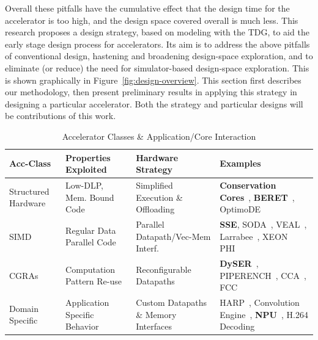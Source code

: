 Overall these pitfalls have the cumulative effect that the design time for the
accelerator is too high, and the design space covered overall is much less. 
This research proposes a design strategy, based on modeling
with the TDG, to aid the early stage design process for accelerators.  
Its aim is to address the above pitfalls of conventional design, 
hastening and broadening design-space exploration, and to
eliminate (or reduce) the need for simulator-based design-space exploration.  
This is shown graphically in Figure~\ref{fig:design-overview}.
This section first describes our methodology,
then present preliminary results in applying
this strategy in designing a particular accelerator.  Both the strategy and
particular designs will be contributions of this work.

\begin{table}
\footnotesize
\def\arraystretch{1.05}
\setlength{\tabcolsep}{.12em}

     \begin{tabular}{>{\RaggedRight}p{0.9in}>{\RaggedRight}p{1.7in}>{\RaggedRight}p{1.7in}>{\RaggedRight}p{2.1in}}  \toprule
    \textbf{Acc-Class} & \textbf{Properties Exploited} &  \textbf{Hardware Strategy} & \textbf{Examples}  \\ \midrule

    Structured Hardware
    & Low-DLP, Mem. Bound Code 
    & Simplified Execution \& Offloading 
    & \textbf{Conservation Cores}~\cite{ccores}, \textbf{BERET}~\cite{Gupta:2011:BER:2155620.2155623}, OptimoDE~\cite{optimoDE}
   \\ 

   SIMD 
   & Regular Data Parallel Code 
   & Parallel Datapath/Vec-Mem Interf.
   & \textbf{SSE}, SODA~\cite{Lin:2006:SLA:1135775.1136494}, VEAL~\cite{VEAL}, Larrabee~\cite{larrabee}, XEON PHI~\cite{chrysos2012intel}
   \\

   CGRAs
   & Computation Pattern Re-use
   & Reconfigurable Datapaths
   & \textbf{DySER}~\cite{hpca2011:dyser}, PIPERENCH~\cite{PipeRench}, CCA~\cite{Clark:2004:APG:1038264.1038929}, FCC~\cite{1629148}
   \\

   Domain Specific
   & Application Specific Behavior
   & Custom Datapaths \& Memory Interfaces
   & HARP~\cite{Wu:2013:NBD:2485922.2485944}, Convolution Engine~\cite{Qadeer:2013:CEB:2485922.2485925}, \textbf{NPU}~\cite{npu}, H.264 Decoding~\cite{Hameed:2010:USI:1815961.1815968}
   \\
    
\bottomrule
  \end{tabular}
  \caption{Accelerator Classes \&  Application/Core Interaction}
  \label{tab:overview}
\vspace{-0.1in}
\end{table}

